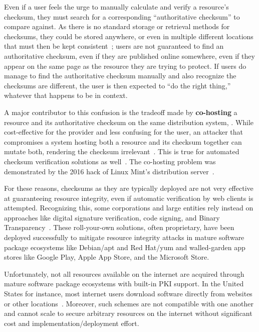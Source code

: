 Even if a user feels the urge to manually calculate and verify a resource's
checksum, they must search for a corresponding ``authoritative checksum'' to
compare against. As there is no standard storage or retrieval methods for
checksums, they could be stored anywhere, or even in multiple different
locations that must then be kept consistent~\cite{Cherubini}; users are not
guaranteed to find an authoritative checksum, even if they are published online
somewhere, even if they appear on the same page as the resource they are trying
to protect. If users do manage to find the authoritative checksum manually and
also recognize the checksums are different, the user is then expected to ``do
the right thing,'' whatever that happens to be in context.

A major contributor to this confusion is the tradeoff made by
\textbf{co-hosting} a resource and its authoritative checksum on the same
distribution system, . While
cost-effective for the provider and less confusing for the user, an attacker
that compromises a system hosting both a resource and its checksum together can
mutate both, rendering the checksum irrelevant~\cite{Stickler}. This is true for
automated checksum verification solutions as well~\cite{Cherubini}. The
co-hosting problem was demonstrated by the 2016 hack of Linux Mint's
distribution server~\cite{SCA-MINT1, SCA-MINT2}.

For these reasons, checksums as they are typically deployed are not very
effective at guaranteeing resource integrity, even if automatic verification by
web clients is attempted. Recognizing this, some corporations and large entities
rely instead on approaches like digital signature verification, code signing,
and Binary Transparency~\cite{PKI, BinaryTransparency}. These roll-your-own
solutions, often proprietary, have been deployed successfully to mitigate
resource integrity attacks in mature software package ecosystems like Debian/apt
and Red Hat/yum and walled-garden app stores like Google Play, Apple App Store,
and the Microsoft Store.

Unfortunately, not all resources available on the internet are acquired through
mature software package ecosystems with built-in PKI support. In the United
States for instance, most internet users download software directly from
websites or other locations~\cite{Cherubini, Ryan}. 
Moreover, such schemes are not compatible with one another and cannot scale to
secure arbitrary resources on the internet without significant cost and
implementation/deployment effort.

